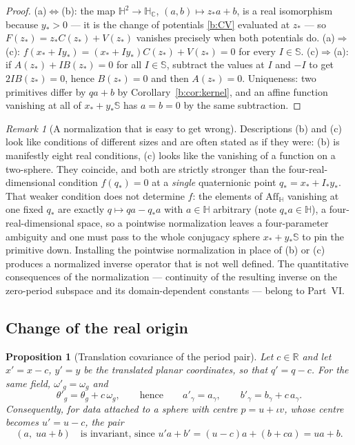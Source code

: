 \documentclass[11pt,a4paper]{article}
\numberwithin{equation}{section}
\newtheorem{proposition}[theorem]{Proposition}
\theoremstyle{definition}
\theoremstyle{remark}
\newtheorem{remark}[theorem]{Remark}
\theoremstyle{plain}
\newcommand{\HH}{\mathbb H}
\newcommand{\HC}{\mathbb H_{\mathbb C}}
\newcommand{\RR}{\mathbb R}
\newcommand{\SSS}{\mathbb S}
\newcommand{\Aff}{\mathrm{Aff}_{\HH}}
\newcommand{\om}{\omega}
\newcommand{\thet}{\theta}
\newcommand{\pot}{C}          %
\newcommand{\potV}{V}         %
\begin{document}
\begin{proof}
(a)$\Leftrightarrow$(b): the map $\HH^2\to\HC$, $(a,b)\mapsto z_*a+b$, is a
real isomorphism because $y_*>0$ --- it is the change of potentials
\eqref{b:CV} evaluated at $z_*$ --- so $F(z_*)=z_*\pot(z_*)+\potV(z_*)$
vanishes precisely when both potentials do.
(a)$\Rightarrow$(c): $f(x_*+Iy_*)=(x_*+Iy_*)\pot(z_*)+\potV(z_*)=0$ for every
$I\in\SSS$.
(c)$\Rightarrow$(a): if $A(z_*)+IB(z_*)=0$ for all $I\in\SSS$, subtract the
values at $I$ and $-I$ to get $2IB(z_*)=0$, hence $B(z_*)=0$ and then
$A(z_*)=0$.  Uniqueness: two primitives differ by $qa+b$ by
Corollary~\ref{b:cor:kernel}, and an affine function vanishing at all of
$x_*+y_*\SSS$ has $a=b=0$ by the same subtraction.
\end{proof}

\begin{remark}[A normalization that is easy to get wrong]
\label{b:rem:eightnotfour}
Descriptions (b) and (c) look like conditions of different sizes and are
often stated as if they were: (b) is manifestly eight real conditions, (c)
looks like the vanishing of a function on a two-sphere.  They coincide, and
both are strictly stronger than the four-real-dimensional condition
$f(q_*)=0$ at a \emph{single} quaternionic point $q_*=x_*+I_*y_*$.
That weaker condition does not determine $f$: the elements of $\Aff$ vanishing
at one fixed $q_*$ are exactly $q\mapsto qa-q_*a$ with $a\in\HH$ arbitrary
(note $q_*a\in\HH$), a four-real-dimensional space, so a pointwise
normalization leaves a four-parameter ambiguity and one must pass to the whole
conjugacy sphere $x_*+y_*\SSS$ to pin the primitive down.  Installing the
pointwise normalization in place of
\textup{(b)} or \textup{(c)} produces a normalized inverse operator that is
not well defined.  The quantitative consequences of the normalization ---
continuity of the resulting inverse on the zero-period subspace and its
domain-dependent constants --- belong to Part~VI.
\end{remark}

\subsection{Change of the real origin}
\label{b:sub:translation}

\begin{proposition}[Translation covariance of the period pair]
\label{b:prop:translation}
Let $c\in\RR$ and let $x'=x-c$, $y'=y$ be the translated planar coordinates,
so that $q'=q-c$.  For the same field, $\om'_g=\om_g$ and
\begin{equation}
 \thet'_g=\thet_g+c\,\om_g,
 \qquad\text{hence}\qquad
 a'_\gamma=a_\gamma,\qquad b'_\gamma=b_\gamma+c\,a_\gamma .
 \label{b:translation}
\end{equation}
Consequently, for data attached to a sphere with centre $p=u+\iota v$, whose
centre becomes $u'=u-c$, the pair
\[
 (a,\;ua+b)\quad\text{is invariant, since } u'a+b'=(u-c)a+(b+ca)=ua+b .
\]
\end{proposition}
\end{document}
